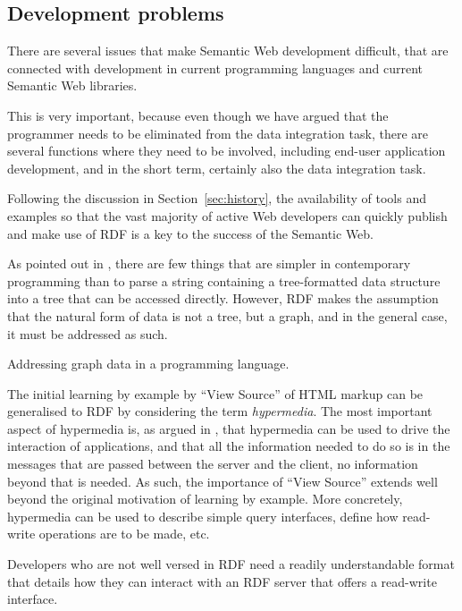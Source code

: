 \subsection{Development problems}\label{sec:devproblems}

There are several issues that make Semantic Web development difficult,
that are connected with development in current programming languages
and current Semantic Web libraries.

This is very important, because even though we have argued that the
programmer needs to be eliminated from the data integration task,
there are several functions where they need to be involved, including
end-user application development, and in the short term, certainly
also the data integration task. 

Following the discussion in Section~\ref{sec:history}, the
availability of tools and examples so that the vast majority of active
Web developers can quickly publish and make use of RDF is a key to the
success of the Semantic Web.

As pointed out in \cite{darobin1}, there are few things that are
simpler in contemporary programming than to parse a string containing
a tree-formatted data structure into a tree that can be accessed
directly. However, RDF makes the assumption that the natural form of
data is not a tree, but a graph, and in the general case, it must be
addressed as such.

\begin{problem}\label{prob:graph}
Addressing graph data in a programming language.
\end{problem}

The initial learning by example by ``View Source'' of HTML markup can
be generalised to RDF by considering the term \emph{hypermedia}. The
most important aspect of hypermedia is, as argued in
\cite{Fielding_2000_Architectural-Styles}, that hypermedia can be used
to drive the interaction of applications, and that all the information
needed to do so is in the messages that are passed between the server
and the client, no information beyond that is needed. As such, the
importance of ``View Source'' extends well beyond the original
motivation of learning by example. More concretely, hypermedia can be
used to describe simple query interfaces, define how read-write
operations are to be made, etc. 

\begin{problem}\label{prob:lapis}
Developers who are not well versed in RDF need a readily
understandable format that details how they can interact with an RDF
server that offers a read-write interface.
\end{problem}

